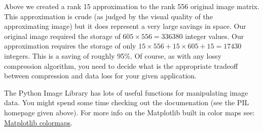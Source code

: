 \documentclass[11pt,letterpaper]{article}
\begin{document}
Above we created a rank 15 approximation to the rank 556 original image matrix. This approximation is crude (as judged by the visual quality of the approximating image) but it does represent a very large savings in space. Our original image required the storage of $605 \times 556 = 336380$ integer values. Our approximation requires the storage of only $15 \times 556 + 15 \times 605 + 15 = 17430$ integers. This is a saving of roughly 95\%. Of course, as with any lossy compression algorithm, you need to decide what is the appropriate tradeoff between compression and data loss for your given application.

The Python Image Library has lots of useful functions for manipulating image data. You might spend some time checking out the documenation (see the PIL homepage given above). For more info on the Matplotlib built in color maps see: \href{http://matplotlib.sourceforge.net/examples/pylab_examples/show_colormaps.html}{Matplotlib colormaps}.

\bigskip
\end{document}
